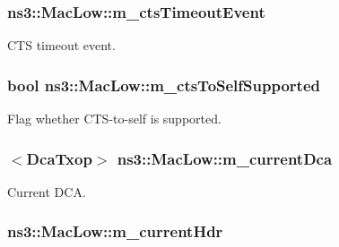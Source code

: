 \subsubsection[{\texorpdfstring{m\+\_\+cts\+Timeout\+Event}{m_ctsTimeoutEvent}}]{ ns3\+::\+Mac\+Low\+::m\+\_\+cts\+Timeout\+Event\hspace{0.3cm}{\ttfamily [private]}}\hypertarget{classns3_1_1MacLow_a1de3cc66dcaa9f318fb1b2cffb108b01}{}\label{classns3_1_1MacLow_a1de3cc66dcaa9f318fb1b2cffb108b01}


C\+TS timeout event. 

\subsubsection[{\texorpdfstring{m\+\_\+cts\+To\+Self\+Supported}{m_ctsToSelfSupported}}]{\setlength{\rightskip}{0pt plus 5cm}bool ns3\+::\+Mac\+Low\+::m\+\_\+cts\+To\+Self\+Supported\hspace{0.3cm}{\ttfamily [private]}}\hypertarget{classns3_1_1MacLow_a3f4e1bf0128e68f6d2b708d66357ac5e}{}\label{classns3_1_1MacLow_a3f4e1bf0128e68f6d2b708d66357ac5e}


Flag whether C\+T\+S-\/to-\/self is supported. 

\subsubsection[{\texorpdfstring{m\+\_\+current\+Dca}{m_currentDca}}]{$<${\bf Dca\+Txop}$>$ ns3\+::\+Mac\+Low\+::m\+\_\+current\+Dca\hspace{0.3cm}{\ttfamily [private]}}\hypertarget{classns3_1_1MacLow_a18945fbeea3c48c6bb8abd2d46429eeb}{}\label{classns3_1_1MacLow_a18945fbeea3c48c6bb8abd2d46429eeb}


Current D\+CA. 

\subsubsection[{\texorpdfstring{m\+\_\+current\+Hdr}{m_currentHdr}}]{ ns3\+::\+Mac\+Low\+::m\+\_\+current\+Hdr\hspace{0.3cm}{\ttfamily [private]}}\hypertarget{classns3_1_1MacLow_aec9902bc8026338baf261d2de8fcd83b}{}\label{classns3_1_1MacLow_aec9902bc8026338baf261d2de8fcd83b}


